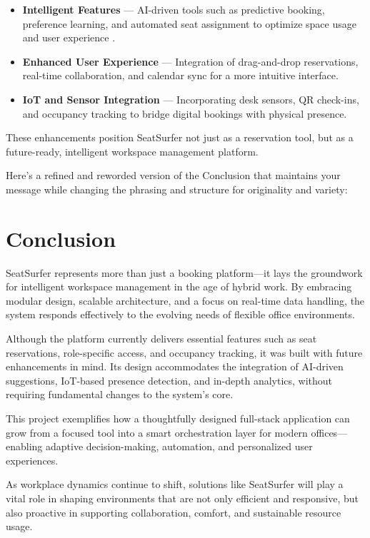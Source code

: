 \documentclass[12pt,a4paper]{report} %
\begin{document}
\begin{itemize}
    \item \textbf{Intelligent Features} — AI-driven tools such as predictive booking, preference learning, and automated seat assignment to optimize space usage and user experience \cite{nguyen2023predictive}.
    \item \textbf{Enhanced User Experience} — Integration of drag-and-drop reservations, real-time collaboration, and calendar sync for a more intuitive interface.
    \item \textbf{IoT and Sensor Integration} — Incorporating desk sensors, QR check-ins, and occupancy tracking to bridge digital bookings with physical presence.
\end{itemize}

These enhancements position SeatSurfer not just as a reservation tool, but as a future-ready, intelligent workspace management platform.

Here's a refined and reworded version of the Conclusion that maintains your message while changing the phrasing and structure for originality and variety:

\section{Conclusion}

SeatSurfer represents more than just a booking platform—it lays the groundwork for intelligent workspace management in the age of hybrid work. By embracing modular design, scalable architecture, and a focus on real-time data handling, the system responds effectively to the evolving needs of flexible office environments.

Although the platform currently delivers essential features such as seat reservations, role-specific access, and occupancy tracking, it was built with future enhancements in mind. Its design accommodates the integration of AI-driven suggestions, IoT-based presence detection, and in-depth analytics, without requiring fundamental changes to the system’s core.

This project exemplifies how a thoughtfully designed full-stack application can grow from a focused tool into a smart orchestration layer for modern offices—enabling adaptive decision-making, automation, and personalized user experiences.

As workplace dynamics continue to shift, solutions like SeatSurfer will play a vital role in shaping environments that are not only efficient and responsive, but also proactive in supporting collaboration, comfort, and sustainable resource usage.
\end{document}

